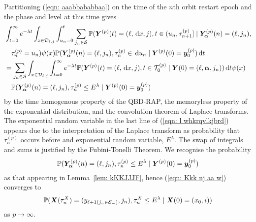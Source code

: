 Partitioning (\ref{eqn: aaabbababbaa}) on the time of the \(n\)th orbit restart epoch and the phase and level at this time gives
\begin{align}
	&\int_{t=0}^\infty e^{-\lambda t} 
	\int_{x\in\mathcal{D}_{\ell,j}}
	\int_{u_n=0}^t\sum_{j_n\in\mathcal S} \mathbb P({\boldsymbol Y}^{(p)}(t) = (\ell,\, \mathrm{d} x,j), 
	t \in(u_n, \tau_{n+1}^{(p)}] \mid\bm{Y}_{\bm{\alpha}}^{(p)}(n) = (\ell,j_n), \nonumber 
	\\&\quad \tau_{n}^{(p)}= u_n)\psi(x) \mathbb P(\bm{Y}_{\bm{\alpha}}^{(p)}(n) = (\ell, j_n), \tau_{n}^{(p)}\in \, \mathrm{d} u_n 
	 \mid \boldsymbol Y^{(p)}(0)=\boldsymbol y_0^{(p)}) 
	  \, \mathrm{d} t \nonumber 
	 \\&= \sum_{j_n\in\mathcal S}
	\int_{x\in\mathcal{D}_{\ell,j}} \int_{t=0}^\infty e^{-\lambda t} \mathbb P({\boldsymbol Y}^{(p)}(t) = (\ell,\, \mathrm{d} x, j), 
	t\in\mathcal T_{0}^{(p)} \mid\nonumber 
	  \boldsymbol Y(0) = (\ell,\boldsymbol\alpha,j_n))\, \mathrm{d} t \psi(x)  
	  \\&\quad{} \mathbb P(\bm{Y}_{\bm{\alpha}}^{(p)}(n) = (\ell,j_n), \tau_{n}^{(p)}\leq E^\lambda 
	 \mid \boldsymbol Y^{(p)}(0)=\boldsymbol y_0^{(p)}) \label{eqn: l whkrqvlkjbrd}
\end{align}
by the time homogenous property of the QBD-RAP, the memoryless property of the exponential distribution, and the convolution theorem of Laplace transforms. The exponential random variable in the last line of (\ref{eqn: l whkrqvlkjbrd}) appears due to the interpretation of the Laplace transform as probability that \(\tau_n^{(p)}\) occurs before and exponential random variable, \(E^\lambda\). The swap of integrals and sums is justified by the Fubini-Tonelli Theorem. We recognise the probability 
\begin{align}
	\mathbb P(\bm{Y}_{\bm{\alpha}}^{(p)}(n) = (\ell, j_n), \tau_{n}^{(p)}\leq E^\lambda 
	 \mid \boldsymbol Y^{(p)}(0)=\boldsymbol y_0^{(p)}) \label{eqn: Kkk nj aa w}
\end{align}
as that appearing in Lemma~\ref{lem: kKKJJJF}, hence (\ref{eqn: Kkk nj aa w}) converges to 
\begin{align}
	\mathbb P(\boldsymbol X(\tau_n^X) = (y_{\ell+1(j_{n}\in\mathcal S_-)}, 
		j_n), \tau_{n}^X\leq E^\lambda
		\mid \boldsymbol X(0)=(x_0, i)) \label{eqn: ashverkjbvjhkhdsknacva}
\end{align}
as \(p\to\infty\). 

